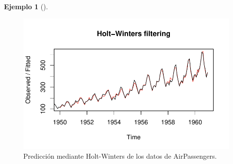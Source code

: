 \documentclass[
  us-letterpaper,
]{scrreprt}
\theoremstyle{plain}
\theoremstyle{definition}
\theoremstyle{definition}
\newtheorem{example}{Ejemplo}[chapter]
\theoremstyle{plain}
\theoremstyle{remark}
\begin{document}
\begin{example}[]
\begin{tcolorbox}
\begin{figure}[H]
\begin{minipage}{0.50\linewidth}
{\includegraphics{series_files/figure-pdf/fig-HWAP-1.pdf}

}


\end{minipage}%
%
\begin{minipage}{0.50\linewidth}



\end{minipage}%

\caption{\label{fig-HWAP}Predicción mediante Holt-Winters de los datos
de AirPassengers.}

\end{figure}%

\end{tcolorbox}

\end{example}
\end{document}
